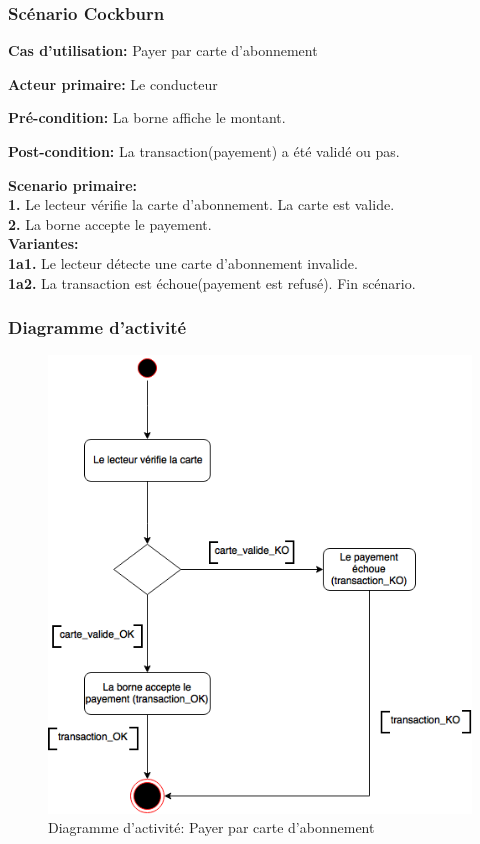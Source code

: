 \subsubsection{Scénario Cockburn}
\textbf{Cas d'utilisation:} Payer par carte d'abonnement

\textbf{Acteur primaire:} Le conducteur

\textbf{Pré-condition: }  La borne affiche le montant.

 
\textbf{Post-condition: }  La transaction(payement) a été validé ou pas.

\textbf{Scenario primaire: } \\
    \textbf{1.} Le lecteur vérifie la carte d'abonnement. La carte est valide. \\
    \textbf{2.} La borne accepte le payement.\\

\textbf{Variantes:}\\
    \textbf{1a1.}   Le lecteur détecte une carte d'abonnement invalide.\\
    \textbf{1a2.}   La transaction est échoue(payement est refusé). Fin scénario.\\
    
\newpage
\subsubsection{Diagramme d'activité}
\begin{figure}[h]
    \centering
    \includegraphics[scale=0.6]{02_Desenvolvimento/TD2/images/DAAbonnement.png}
    \caption{Diagramme d'activité: Payer par carte d'abonnement}
\end{figure}
\newpage
